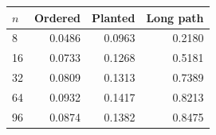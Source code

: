 \begin{tabular}{@{}lrrr@{}}
\toprule
$n$ & Ordered & Planted & Long path\\
\midrule
8 & 0.0486 & 0.0963 & 0.2180\\
16 & 0.0733 & 0.1268 & 0.5181\\
32 & 0.0809 & 0.1313 & 0.7389\\
64 & 0.0932 & 0.1417 & 0.8213\\
96 & 0.0874 & 0.1382 & 0.8475\\
\bottomrule
\end{tabular}
